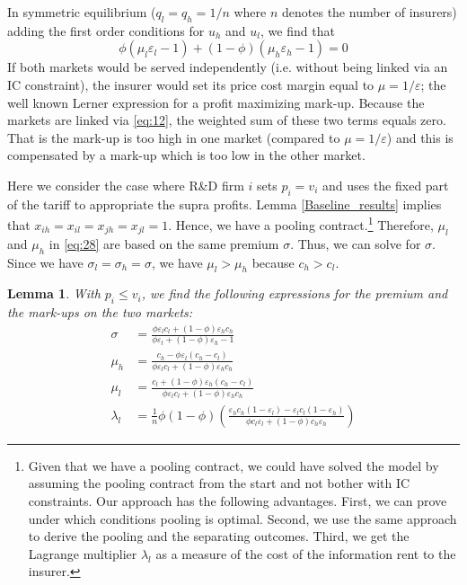 \documentclass[a4paper,12pt]{article}
\newtheorem{lemma}{Lemma}
\begin{document}
In symmetric equilibrium (\(q_l=q_h=1/n\) where \(n\) denotes the number of insurers) adding the first order conditions for \(u_h\) and \(u_l\), we find that
\begin{equation}
\label{eq:28}
\phi (\mu_l \varepsilon_l-1) + (1-\phi) (\mu_h \varepsilon_h -1) = 0
\end{equation}
If both markets would be served independently (i.e. without being linked via an IC constraint), the insurer would set its price cost margin equal to \(\mu = 1/\varepsilon\); the well known Lerner expression for a profit maximizing mark-up. Because the markets are linked via \eqref{eq:12}, the weighted sum of these two terms equals zero. That is the mark-up is too high in one market (compared to \(\mu=1/\varepsilon\)) and this is compensated by a mark-up which is too low in the other market.

Here we consider the case where R\&D firm \(i\) sets \(p_i=v_i\) and uses the fixed part of the tariff to appropriate the supra profits. Lemma \ref{Baseline_results} implies that \(x_{ih}=x_{il}=x_{jh}=x_{jl}=1\). Hence, we have a pooling contract.\footnote{Given that we have a pooling contract, we could have solved the model by assuming the pooling contract from the start and not bother with IC constraints. Our approach has the following advantages. First, we can prove under which conditions pooling is optimal. Second, we use the same approach to derive the pooling and the separating outcomes. Third, we get the Lagrange multiplier \(\lambda_l\) as a measure of the cost of the information rent to the insurer.} Therefore, \(\mu_l\) and \(\mu_h\) in \eqref{eq:28} are based on the same premium \(\sigma\). Thus, we can solve for \(\sigma\). Since we have \(\sigma_l=\sigma_h=\sigma\), we have \(\mu_l > \mu_h\) because \(c_h>c_l\).

\begin{lemma}
\label{Two_part_tariff}
With \(p_i \leq v_i\), we find the following expressions for the premium and the mark-ups on the two markets:
\begin{align}
\label{eq:29}
\sigma &= \frac{\phi \varepsilon_l c_l +(1-\phi) \varepsilon_h c_h }{\phi \varepsilon_l +(1-\phi) \varepsilon_h-1} \\
\label{eq:29a}
\mu_h &=  \frac{c_h -\phi \varepsilon_l (c_{h}-c_l)}{\phi \varepsilon_lc_l +(1-\phi) \varepsilon_h c_h} \\
\label{eq:29b}
\mu_l &=  \frac{c_l +(1-\phi) \varepsilon_h (c_{h}-c_l)}{\phi \varepsilon_lc_l +(1-\phi) \varepsilon_h c_h} \\
\label{eq:43}
\lambda_l &= \frac{1}{n}\phi(1-\phi) \left( \frac{\varepsilon_h c_h (1-\varepsilon_l) - \varepsilon_l c_l (1-\varepsilon_h)}{\phi c_l\varepsilon_l + (1-\phi) c_h \varepsilon_h} \right)
\end{align}
\end{lemma}
\end{document}

